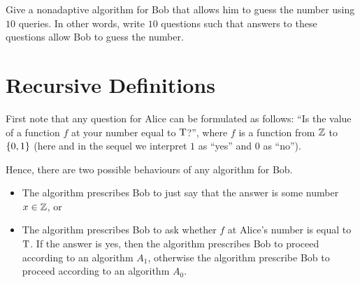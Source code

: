 \begin{exercise}
  Give a nonadaptive algorithm for Bob that allows him to guess the number
  using $10$ queries. In other words, write $10$ questions such that
  answers to these questions allow Bob to guess the number.
\end{exercise}

\section{Recursive Definitions}
First note that any question for Alice can be formulated as follows:
``Is the value of a function $f$ at your number equal to $\text{T}$?'', where
$f$ is a function from ${\mathbb{Z}}$ to $\set{0, 1}$ (here and in the sequel
we interpret $1$ as ``yes'' and $0$ as ``no'').

Hence, there are two possible behaviours of any algorithm for Bob.
\begin{itemize}
  \item The algorithm prescribes Bob to just say that the answer is some
    number $x \in {\mathbb{Z}}$, or
  \item The algorithm prescribes Bob to ask whether $f$ at Alice's number is
    equal to $\text{T}$. If the answer is yes, then the algorithm prescribes Bob
    to proceed according to an algorithm $A_1$, otherwise the algorithm
    prescribe Bob to proceed according to an algorithm $A_0$.
\end{itemize}

